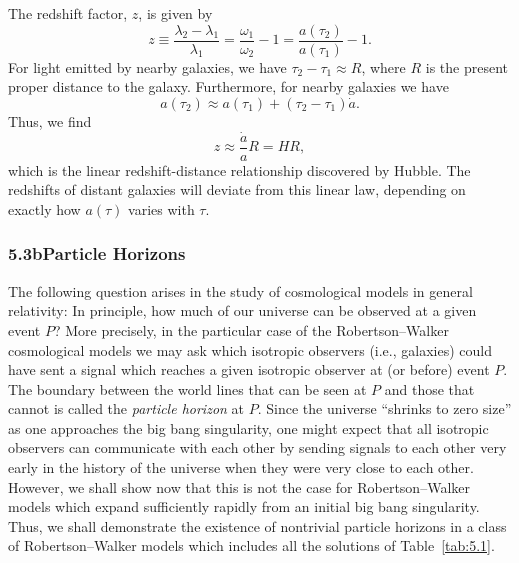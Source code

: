 The redshift factor, \(z\), is given by
\begin{equation}
  z\equiv\frac{\lambda_2-\lambda_1}{\lambda_1}
  =\frac{\omega_1}{\omega_2}-1
  =\frac{a(\tau_2)}{a(\tau_1)}-1.
  \tag{5.3.7}\label{eq:5.3.7}
\end{equation}
For light emitted by nearby galaxies, we have \(\tau_2-\tau_1\approx R\), where
\(R\) is the present proper distance to the galaxy. Furthermore, for nearby galaxies
we have
\begin{equation}
  a(\tau_2)\approx a(\tau_1)+(\tau_2-\tau_1)\dot a.
  \tag{5.3.8}\label{eq:5.3.8}
\end{equation}
Thus, we find
\begin{equation}
  z\approx\frac{\dot a}{a}R=HR,
  \tag{5.3.9}\label{eq:5.3.9}
\end{equation}
which is the linear redshift-distance relationship discovered by Hubble. The redshifts
of distant galaxies will deviate from this linear law, depending on exactly how
\(a(\tau)\) varies with \(\tau\).

\subsubsection*{5.3b\quad Particle Horizons}

The following question arises in the study of cosmological models in general
relativity: In principle, how much of our universe can be observed at a given event
\(P\)? More precisely, in the particular case of the Robertson--Walker cosmological
models we may ask which isotropic observers (i.e., galaxies) could have sent a signal
which reaches a given isotropic observer at (or before) event \(P\). The boundary
between the world lines that can be seen at \(P\) and those that cannot is called the
\emph{particle horizon} at \(P\). Since the universe ``shrinks to zero size'' as one
approaches the big bang singularity, one might expect that all isotropic observers can
communicate with each other by sending signals to each other very early in the history
of the universe when they were very close to each other. However, we shall show now
that this is not the case for Robertson--Walker models which expand sufficiently
rapidly from an initial big bang singularity. Thus, we shall demonstrate the existence
of nontrivial particle horizons in a class of Robertson--Walker models which includes
all the solutions of Table~\ref{tab:5.1}.

